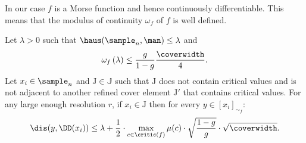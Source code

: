 In our case $f$ is a Morse function and hence continuously differentiable. This means that the modulus of continuity $\omega_f$ of $f$ is well defined.

\begin{lemma}\label{lem:slice}
Let $\lambda>0$ such that $\haus(\sample_n,\man)\leq \lambda$ and
$$\omega_f\left(\lambda\right)\leq\frac{g}{1-g} \frac{\coverwidth}{4}.$$
Let $x_i\in\sample_n$ and $\mathrm{J}\in\mathbb{J}$ such that $\mathrm{J}$ does not contain critical values and is not adjacent to another refined cover element $\mathrm{J}'$ that contains critical values. For any large enough resolution $r$, if $x_i\in\mathrm{J}$ then for every $y\in[x_i]_{\sim_f}$:
$$\dis(y,\DD(x_i))\leq \lambda+\frac{1}{2}\cdot\max_{c\in\critic(f)}\mu(c)\cdot\sqrt{\frac{1-g}{g}}\cdot\sqrt{\coverwidth}.$$
\end{lemma}

